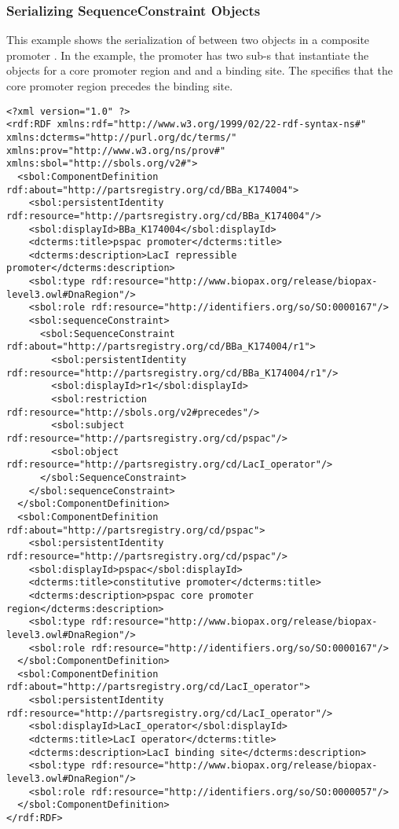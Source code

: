 \subsubsection{Serializing SequenceConstraint Objects}
 This example shows the serialization of  between two  objects in a composite promoter . In the example, the promoter  has two sub-s that instantiate the  objects for a core promoter region and and a binding site. The  specifies that the core promoter region precedes the binding site.
\begin{lstlisting}
<?xml version="1.0" ?>
<rdf:RDF xmlns:rdf="http://www.w3.org/1999/02/22-rdf-syntax-ns#" xmlns:dcterms="http://purl.org/dc/terms/" xmlns:prov="http://www.w3.org/ns/prov#" xmlns:sbol="http://sbols.org/v2#">
  <sbol:ComponentDefinition rdf:about="http://partsregistry.org/cd/BBa_K174004">
    <sbol:persistentIdentity rdf:resource="http://partsregistry.org/cd/BBa_K174004"/>
    <sbol:displayId>BBa_K174004</sbol:displayId>
    <dcterms:title>pspac promoter</dcterms:title>
    <dcterms:description>LacI repressible promoter</dcterms:description>
    <sbol:type rdf:resource="http://www.biopax.org/release/biopax-level3.owl#DnaRegion"/>
    <sbol:role rdf:resource="http://identifiers.org/so/SO:0000167"/>
    <sbol:sequenceConstraint>
      <sbol:SequenceConstraint rdf:about="http://partsregistry.org/cd/BBa_K174004/r1">
        <sbol:persistentIdentity rdf:resource="http://partsregistry.org/cd/BBa_K174004/r1"/>
        <sbol:displayId>r1</sbol:displayId>
        <sbol:restriction rdf:resource="http://sbols.org/v2#precedes"/>
        <sbol:subject rdf:resource="http://partsregistry.org/cd/pspac"/>
        <sbol:object rdf:resource="http://partsregistry.org/cd/LacI_operator"/>
      </sbol:SequenceConstraint>
    </sbol:sequenceConstraint>
  </sbol:ComponentDefinition>
  <sbol:ComponentDefinition rdf:about="http://partsregistry.org/cd/pspac">
    <sbol:persistentIdentity rdf:resource="http://partsregistry.org/cd/pspac"/>
    <sbol:displayId>pspac</sbol:displayId>
    <dcterms:title>constitutive promoter</dcterms:title>
    <dcterms:description>pspac core promoter region</dcterms:description>
    <sbol:type rdf:resource="http://www.biopax.org/release/biopax-level3.owl#DnaRegion"/>
    <sbol:role rdf:resource="http://identifiers.org/so/SO:0000167"/>
  </sbol:ComponentDefinition>
  <sbol:ComponentDefinition rdf:about="http://partsregistry.org/cd/LacI_operator">
    <sbol:persistentIdentity rdf:resource="http://partsregistry.org/cd/LacI_operator"/>
    <sbol:displayId>LacI_operator</sbol:displayId>
    <dcterms:title>LacI operator</dcterms:title>
    <dcterms:description>LacI binding site</dcterms:description>
    <sbol:type rdf:resource="http://www.biopax.org/release/biopax-level3.owl#DnaRegion"/>
    <sbol:role rdf:resource="http://identifiers.org/so/SO:0000057"/>
  </sbol:ComponentDefinition>
</rdf:RDF>
\end{lstlisting}

